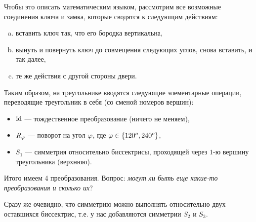 Чтобы это описать математическим языком, рассмотрим все возможные соединения ключа и замка, которые сводятся к следующим действиям:
\begin{enumerate}[a)]
\item вставить ключ так, что его бородка вертикальна,
\item вынуть и повернуть ключ до совмещения следующих углов, снова вставить, и так далее,
\item те же действия с другой стороны двери.
\end{enumerate}

Таким образом, на треугольнике вводятся следующие элементарные операции, переводящие треугольник в себя (со сменой номеров вершин):
\begin{itemize}
\item $\mathrm{id}$ --- тождественное преобразование (ничего не меняем),
\item $R_\varphi$ --- поворот на угол $\varphi$, где $\varphi\in\{120^o,240^o\}$,
\item $S_1$ --- симметрия относительно биссектрисы, проходящей через $1$-ю вершину треугольника (верхнюю).
\end{itemize}

Итого имеем 4 преобразования. Вопрос: \textit{могут ли быть еще какие-то преобразования и сколько их}?

Сразу же очевидно, что симметрию можно выполнять относительно двух оставшихся биссектрис, т.е. у нас добавляются симметрии $S_2$ и $S_3$.

